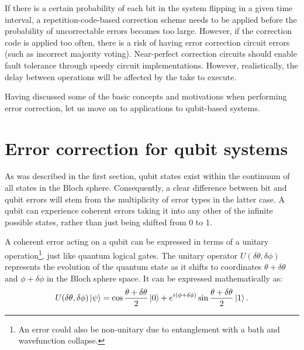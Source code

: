 If there is a certain probability of each bit in the system flipping in a given time interval, a repetition-code-based correction scheme needs to be applied before the probability of uncorrectable errors becomes too large. However, if the correction code is applied too often, there is a risk of having error correction circuit errors (such as incorrect majority voting). Near-perfect correction circuits should enable fault tolerance through speedy circuit implementations. However, realistically, the delay between operations will be affected by the take to execute.

Having discussed some of the basic concepts and motivations when performing error correction, let us move on to applications to qubit-based systems.


\section{Error correction for qubit systems}

As was described in the first section, qubit states exist within the continuum of all states in the Bloch sphere. Consequently, a clear difference between bit and qubit errors will stem from the multiplicity of error types in the latter case. A qubit can experience coherent errors taking it into any other of the infinite possible states, rather than just being shifted from 0 to 1.

A coherent error acting on a qubit can be expressed in terms of a unitary operation\footnote{An error could also be non-unitary due to entanglement with a bath and wavefunction collapse.}, just like quantum logical gates. The unitary operator $U(\delta\theta,\delta\phi)$ represents the evolution of the quantum state as it shifts to coordinates $\theta+\delta\theta$ and $\phi+\delta\phi$ in the Bloch sphere space. It can be expressed mathematically as:
\begin{equation}
    U(\delta\theta,\delta\phi)\ket{\psi} = \cos\frac{\theta+\delta\theta}{2}\ket{0}+e^{i(\phi+\delta\phi)}\sin\frac{\theta+\delta\theta}{2}\ket{1}.
\end{equation}

